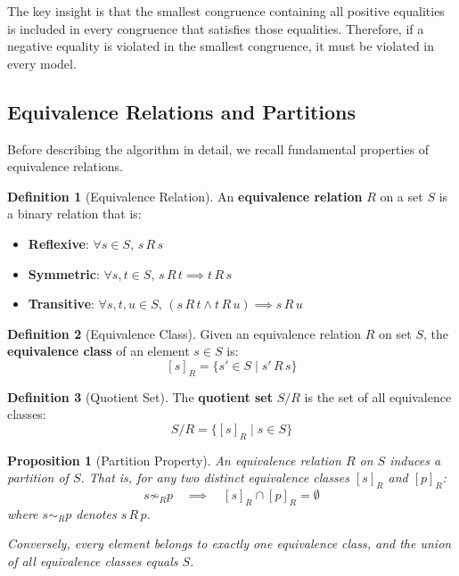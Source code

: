 \documentclass[11pt,a4paper]{article}
\theoremstyle{definition}
\newtheorem{definition}{Definition}[section]
\theoremstyle{plain}
\newtheorem{proposition}[theorem]{Proposition}
\theoremstyle{remark}
\begin{document}
The key insight is that the smallest congruence containing all positive equalities is included in every congruence that satisfies those equalities. Therefore, if a negative equality is violated in the smallest congruence, it must be violated in every model.

\subsection{Equivalence Relations and Partitions}

Before describing the algorithm in detail, we recall fundamental properties of equivalence relations.

\begin{tcolorbox}[colback=teal!10!white,colframe=teal!75!black,title=\textbf{Equivalence Relation}]
\begin{definition}[Equivalence Relation]
An \textbf{equivalence relation} $R$ on a set $S$ is a binary relation that is:
\begin{itemize}
    \item \textbf{Reflexive}: $\forall s \in S, \, s \, R \, s$
    \item \textbf{Symmetric}: $\forall s, t \in S, \, s \, R \, t \implies t \, R \, s$
    \item \textbf{Transitive}: $\forall s, t, u \in S, \, (s \, R \, t \wedge t \, R \, u) \implies s \, R \, u$
\end{itemize}
\end{definition}
\end{tcolorbox}

\begin{definition}[Equivalence Class]
Given an equivalence relation $R$ on set $S$, the \textbf{equivalence class} of an element $s \in S$ is:
\[
[s]_R = \{s' \in S \mid s' \, R \, s\}
\]
\end{definition}

\begin{definition}[Quotient Set]
The \textbf{quotient set} $S/R$ is the set of all equivalence classes:
\[
S/R = \{[s]_R \mid s \in S\}
\]
\end{definition}

\begin{proposition}[Partition Property]
An equivalence relation $R$ on $S$ induces a partition of $S$. That is, for any two distinct equivalence classes $[s]_R$ and $[p]_R$:
\[
s \not\sim_R p \quad \implies \quad [s]_R \cap [p]_R = \emptyset
\]
where $s \sim_R p$ denotes $s \, R \, p$.

Conversely, every element belongs to exactly one equivalence class, and the union of all equivalence classes equals $S$.
\end{proposition}
\end{document}
